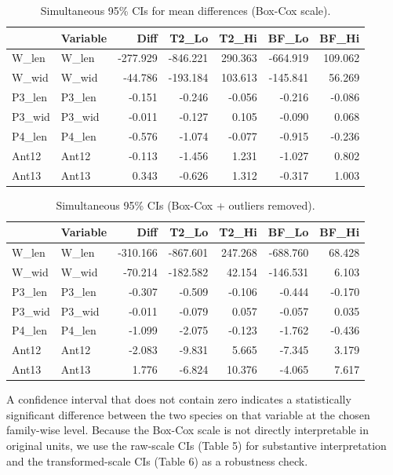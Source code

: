 \documentclass[
  11pt,
]{article}
\begin{document}
\begin{longtable}[t]{llrrrrr}
\caption{\label{tab:ci-tbl-bc}Simultaneous 95\% CIs for mean differences (Box-Cox scale).}\\
\toprule
 & Variable & Diff & T2\_Lo & T2\_Hi & BF\_Lo & BF\_Hi\\
\midrule
W\_len & W\_len & -277.929 & -846.221 & 290.363 & -664.919 & 109.062\\
W\_wid & W\_wid & -44.786 & -193.184 & 103.613 & -145.841 & 56.269\\
P3\_len & P3\_len & -0.151 & -0.246 & -0.056 & -0.216 & -0.086\\
P3\_wid & P3\_wid & -0.011 & -0.127 & 0.105 & -0.090 & 0.068\\
P4\_len & P4\_len & -0.576 & -1.074 & -0.077 & -0.915 & -0.236\\
\addlinespace
Ant12 & Ant12 & -0.113 & -1.456 & 1.231 & -1.027 & 0.802\\
Ant13 & Ant13 & 0.343 & -0.626 & 1.312 & -0.317 & 1.003\\
\bottomrule
\end{longtable}

\begin{longtable}[t]{llrrrrr}
\caption{\label{tab:ci-tbl-clean}Simultaneous 95\% CIs (Box-Cox + outliers removed).}\\
\toprule
 & Variable & Diff & T2\_Lo & T2\_Hi & BF\_Lo & BF\_Hi\\
\midrule
W\_len & W\_len & -310.166 & -867.601 & 247.268 & -688.760 & 68.428\\
W\_wid & W\_wid & -70.214 & -182.582 & 42.154 & -146.531 & 6.103\\
P3\_len & P3\_len & -0.307 & -0.509 & -0.106 & -0.444 & -0.170\\
P3\_wid & P3\_wid & -0.011 & -0.079 & 0.057 & -0.057 & 0.035\\
P4\_len & P4\_len & -1.099 & -2.075 & -0.123 & -1.762 & -0.436\\
\addlinespace
Ant12 & Ant12 & -2.083 & -9.831 & 5.665 & -7.345 & 3.179\\
Ant13 & Ant13 & 1.776 & -6.824 & 10.376 & -4.065 & 7.617\\
\bottomrule
\end{longtable}

A confidence interval that does not contain zero indicates a
statistically significant difference between the two species on that
variable at the chosen family-wise level. Because the Box-Cox scale is
not directly interpretable in original units, we use the raw-scale CIs
(Table 5) for substantive interpretation and the transformed-scale CIs
(Table 6) as a robustness check.
\end{document}
